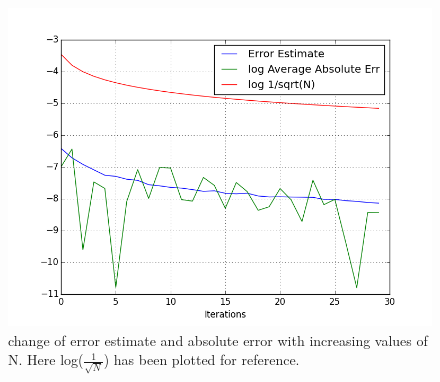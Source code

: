 \documentclass[a4paper,11pt]{article}
\begin{document}
\begin{figure}[ht]
	\centering
    \includegraphics[scale=0.80]{err_est.png}
    \caption{change of error estimate and absolute error with increasing values of N. Here log($\frac{1}{\sqrt{N}}$) has been plotted for reference.}
	\label{fig:Y2}
\end{figure}
\end{document}
